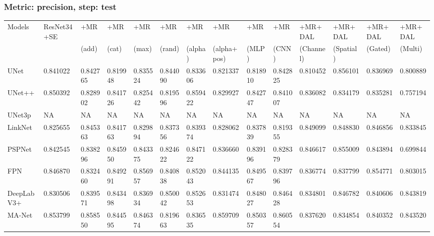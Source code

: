 \documentclass{article}
\begin{document}
\subsubsection{Metric: precision, step: test}
\begin{tabular}{llllllllllllll}
\toprule
Models & ResNet34+SE & +MR  & +MR  & +MR  & +MR  & +MR  & +MR  & +MR  & +MR  & +MR+DAL & +MR+DAL & +MR+DAL & +MR+DAL \\
       &             &  (add) &  (cat) &  (max) &  (rand) &  (alpha) &  (alpha+pos) &  (MLP) &  (CNN) & (Channel) & (Spatial) & (Gated) & (Multi) \\
\midrule
UNet & 0.841022 & 0.842765 & 0.819948 & 0.835524 & 0.844090 & 0.833606 & 0.821337 & 0.818910 & 0.842825 & 0.810452 & 0.856101 & 0.836969 & 0.800889 \\
UNet++ & 0.850392 & 0.828902 & 0.841726 & 0.825442 & 0.819596 & 0.859422 & 0.829927 & 0.842747 & 0.841007 & 0.836082 & 0.834179 & 0.835281 & 0.757194 \\
UNet3p & NA & NA & NA & NA & NA & NA & NA & NA & NA & NA & NA & NA & NA \\
LinkNet & 0.825655 & 0.845363 & 0.841763 & 0.829894 & 0.837356 & 0.839374 & 0.828062 & 0.837839 & 0.819355 & 0.849099 & 0.848830 & 0.846856 & 0.833845 \\
PSPNet & 0.842545 & 0.838296 & 0.845950 & 0.843375 & 0.824622 & 0.847122 & 0.836660 & 0.839196 & 0.828379 & 0.846617 & 0.855009 & 0.843894 & 0.699844 \\
FPN & 0.846870 & 0.832460 & 0.849291 & 0.856957 & 0.840838 & 0.852043 & 0.844135 & 0.849567 & 0.839796 & 0.836774 & 0.837799 & 0.854771 & 0.803015 \\
DeepLabV3+ & 0.830506 & 0.839571 & 0.843498 & 0.836934 & 0.850042 & 0.852653 & 0.831474 & 0.848027 & 0.846428 & 0.834801 & 0.846782 & 0.840606 & 0.843819 \\
MA-Net & 0.853799 & 0.858550 & 0.844595 & 0.846374 & 0.819663 & 0.836535 & 0.859709 & 0.850357 & 0.860554 & 0.837620 & 0.834854 & 0.840352 & 0.843520 \\
\bottomrule
\end{tabular}
\end{document}
